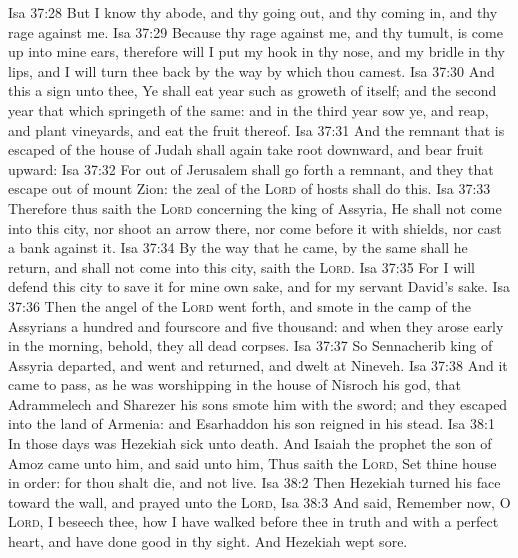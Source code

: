 \vs Isa 37:28 But I know thy abode, and thy going out, and thy coming in, and thy rage against me.
\vs Isa 37:29 Because thy rage against me, and thy tumult, is come up into mine ears, therefore will I put my hook in thy nose, and my bridle in thy lips, and I will turn thee back by the way by which thou camest.
\vs Isa 37:30 And this  a sign unto thee, Ye shall eat  year such as groweth of itself; and the second year that which springeth of the same: and in the third year sow ye, and reap, and plant vineyards, and eat the fruit thereof.
\vs Isa 37:31 And the remnant that is escaped of the house of Judah shall again take root downward, and bear fruit upward:
\vs Isa 37:32 For out of Jerusalem shall go forth a remnant, and they that escape out of mount Zion: the zeal of the \textsc{Lord} of hosts shall do this.
\vs Isa 37:33 Therefore thus saith the \textsc{Lord} concerning the king of Assyria, He shall not come into this city, nor shoot an arrow there, nor come before it with shields, nor cast a bank against it.
\vs Isa 37:34 By the way that he came, by the same shall he return, and shall not come into this city, saith the \textsc{Lord}.
\vs Isa 37:35 For I will defend this city to save it for mine own sake, and for my servant David's sake.
\vs Isa 37:36 Then the angel of the \textsc{Lord} went forth, and smote in the camp of the Assyrians a hundred and fourscore and five thousand: and when they arose early in the morning, behold, they  all dead corpses.
\vs Isa 37:37 So Sennacherib king of Assyria departed, and went and returned, and dwelt at Nineveh.
\vs Isa 37:38 And it came to pass, as he was worshipping in the house of Nisroch his god, that Adrammelech and Sharezer his sons smote him with the sword; and they escaped into the land of Armenia: and Esarhaddon his son reigned in his stead.
\vs Isa 38:1 In those days was Hezekiah sick unto death. And Isaiah the prophet the son of Amoz came unto him, and said unto him, Thus saith the \textsc{Lord}, Set thine house in order: for thou shalt die, and not live.
\vs Isa 38:2 Then Hezekiah turned his face toward the wall, and prayed unto the \textsc{Lord},
\vs Isa 38:3 And said, Remember now, O \textsc{Lord}, I beseech thee, how I have walked before thee in truth and with a perfect heart, and have done  good in thy sight. And Hezekiah wept sore.
